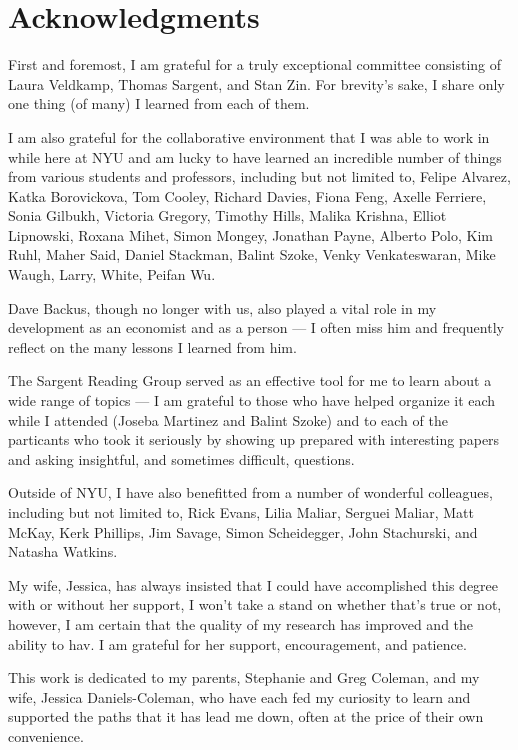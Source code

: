 \documentclass[12pt,letterpaper,oneside,final]{memoir}
\begin{document}
\newpage

\chapter{Acknowledgments}

  First and foremost, I am grateful for a truly exceptional committee consisting of Laura Veldkamp,
  Thomas Sargent, and Stan Zin. For brevity's sake, I share only one thing (of many) I learned from
  each of them.

  I am also grateful for the collaborative environment that I was able to work in while here at NYU
  and am lucky to have learned an incredible number of things from various students and professors,
  including but not limited to, Felipe Alvarez, Katka Borovickova, Tom Cooley, Richard Davies, Fiona
  Feng, Axelle Ferriere, Sonia Gilbukh, Victoria Gregory, Timothy Hills, Malika Krishna, Elliot
  Lipnowski, Roxana Mihet, Simon Mongey, Jonathan Payne, Alberto Polo, Kim Ruhl, Maher Said, Daniel
  Stackman, Balint Szoke, Venky Venkateswaran, Mike Waugh, Larry, White, Peifan Wu.

  Dave Backus, though no longer with us, also played a vital role in my development as an economist
  and as a person --- I often miss him and frequently reflect on the many lessons I learned from
  him.

  The Sargent Reading Group served as an effective tool for me to learn about a wide range of topics
  --- I am grateful to those who have helped organize it each while I attended (Joseba Martinez and
  Balint Szoke) and to each of the particants who took it seriously by showing up prepared with
  interesting papers and asking insightful, and sometimes difficult, questions.

  Outside of NYU, I have also benefitted from a number of wonderful colleagues, including but not
  limited to, Rick Evans, Lilia Maliar, Serguei Maliar, Matt McKay, Kerk Phillips, Jim Savage, Simon
  Scheidegger, John Stachurski, and Natasha Watkins.

  My wife, Jessica, has always insisted that I could have accomplished this degree with or without
  her support, I won't take a stand on whether that's true or not, however, I am certain that the
  quality of my research has improved and the ability to hav. I am grateful for her
  support, encouragement, and patience.

  This work is dedicated to my parents, Stephanie and Greg Coleman, and my wife, Jessica
  Daniels-Coleman, who have each fed my curiosity to learn and supported the paths that it has lead
  me down, often at the price of their own convenience.
\end{document}
